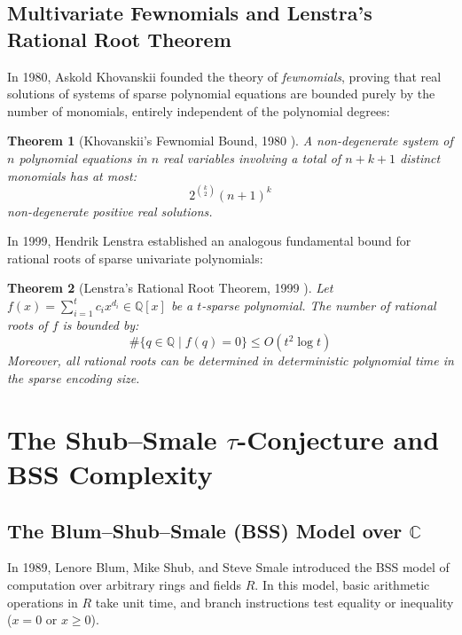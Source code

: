 \documentclass[11pt,a4paper]{article}
\newtheorem{theorem}{Theorem}[section]
\theoremstyle{definition}
\begin{document}
\subsection{Multivariate Fewnomials and Lenstra's Rational Root Theorem}

In 1980, Askold Khovanskii \cite{khovanskii1980} founded the theory of \emph{fewnomials}, proving that real solutions of systems of sparse polynomial equations are bounded purely by the number of monomials, entirely independent of the polynomial degrees:

\begin{theorem}[Khovanskii's Fewnomial Bound, 1980 \cite{khovanskii1980}]\label{thm:khovanskii}
A non-degenerate system of $n$ polynomial equations in $n$ real variables involving a total of $n + k + 1$ distinct monomials has at most:
\begin{equation}\label{eq:khovanskii_bound}
2^{\binom{k}{2}} (n + 1)^k
\end{equation}
non-degenerate positive real solutions.
\end{theorem}

In 1999, Hendrik Lenstra \cite{lenstra1999} established an analogous fundamental bound for rational roots of sparse univariate polynomials:

\begin{theorem}[Lenstra's Rational Root Theorem, 1999 \cite{lenstra1999}]\label{thm:lenstra}
Let $f(x) = \sum_{i=1}^t c_i x^{d_i} \in \mathbb{Q}[x]$ be a $t$-sparse polynomial. The number of rational roots of $f$ is bounded by:
\begin{equation}\label{eq:lenstra_bound}
\# \{ q \in \mathbb{Q} \mid f(q) = 0 \} \le O(t^2 \log t)
\end{equation}
Moreover, all rational roots can be determined in deterministic polynomial time in the sparse encoding size.
\end{theorem}

\section{The Shub--Smale $\tau$-Conjecture and BSS Complexity}

\subsection{The Blum--Shub--Smale (BSS) Model over $\mathbb{C}$}

In 1989, Lenore Blum, Mike Shub, and Steve Smale \cite{blum1989} introduced the BSS model of computation over arbitrary rings and fields $R$. In this model, basic arithmetic operations in $R$ take unit time, and branch instructions test equality or inequality ($x = 0$ or $x \ge 0$).
\end{document}
